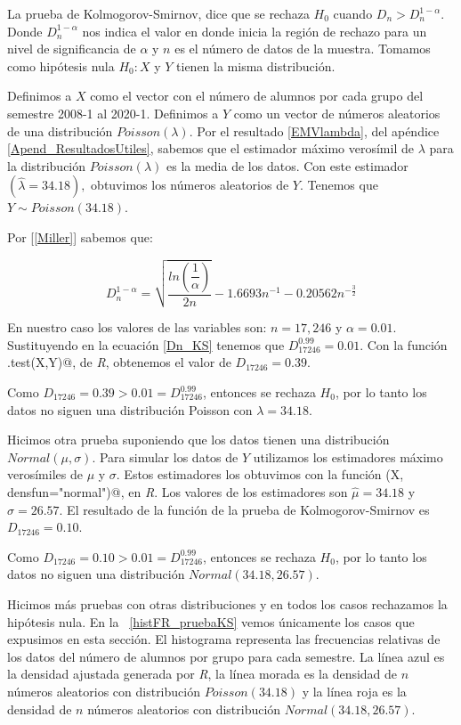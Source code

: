 La prueba de Kolmogorov-Smirnov, dice que se rechaza $H_{0}$ cuando $D_{n} > D_{n}^{1-\alpha}$. Donde $D_{n}^{1-\alpha}$ nos indica el valor en donde inicia la región de rechazo para un nivel de significancia de $\alpha$ y $n$ es el número de datos de la muestra. Tomamos como hipótesis nula $H_{0}: X$ y $Y$ tienen la misma distribución.

Definimos a $X$ como el vector con el número de alumnos por cada grupo del semestre 2008-1 al 2020-1. Definimos a $Y$ como un vector de números aleatorios de una distribución $Poisson(\lambda)$. Por el resultado \ref{EMVlambda}, del apéndice \ref{Apend_ResultadosUtiles}, sabemos que el estimador máximo verosímil de $\lambda$ para la distribución $Poisson(\lambda)$ es la media de los datos. Con este estimador $(\hat{\lambda} = 34.18),$ obtuvimos los números aleatorios de $Y$. Tenemos que $Y \sim Poisson(34.18)$.%

Por [\ref{Miller}] sabemos que:
  
  \begin{equation}\label{Dn_KS}
D_{n}^{1-\alpha} = \sqrt{\dfrac{ln \left(\dfrac{1}{\alpha}\right)}{2n}} - 1.6693 n^{-1} - 0.20562 n^{-\frac{3}{2}}
\end{equation}

En nuestro caso los valores de las variables son: $n = 17,246$ y $\alpha = 0.01$. Sustituyendo en la ecuación \ref{Dn_KS} tenemos que $D_{17246}^{0.99} = 0.01$. Con la función \verb@ks.test(X,Y)@, de \textit{R}, obtenemos el valor de $D_{17246} = 0.39$.

Como $D_{17246} = 0.39 > 0.01 = D_{17246}^{0.99}$, entonces se rechaza $H_{0}$, por lo tanto los datos no siguen una distribución Poisson con $\lambda = 34.18$.


Hicimos otra prueba suponiendo que los datos tienen una distribución $Normal(\mu,\sigma)$. Para simular los datos de $Y$ utilizamos los estimadores máximo verosímiles de $\mu$ y $\sigma$. Estos estimadores los obtuvimos con la función \verb@fitdistr(X, densfun="normal")@, en \textit{R}. Los valores de los estimadores son $\hat{\mu} = 34.18$ y $\hat{\sigma} = 26.57$. El resultado de la función de la prueba de Kolmogorov-Smirnov es $D_{17246} = 0.10$.

Como $D_{17246} = 0.10 > 0.01 = D_{17246}^{0.99}$, entonces se rechaza $H_{0}$, por lo tanto los datos no siguen una distribución $Normal(34.18,26.57)$.

Hicimos más pruebas con otras distribuciones y en todos los casos rechazamos la hipótesis nula. En la \figurename{~\ref{histFR_pruebaKS}} vemos únicamente los casos que expusimos en esta sección. El histograma representa las frecuencias relativas de los datos del número de alumnos por grupo para cada semestre. La línea azul es la densidad ajustada generada por \textit{R}, la línea morada es la densidad de $n$ números aleatorios con distribución  $Poisson(34.18)$ y la línea roja es la densidad de $n$ números aleatorios con distribución  $Normal(34.18,26.57)$.

